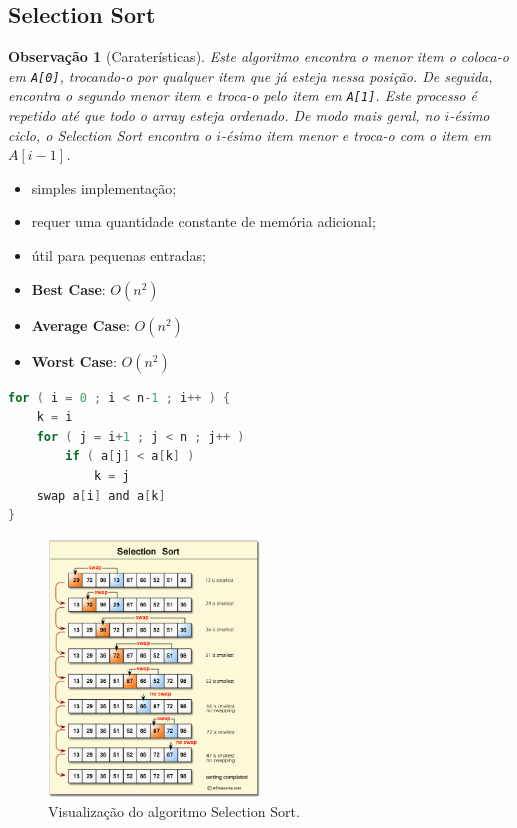 \documentclass[a4paper, 12pt]{article}
\newtheorem{remark}{Observação}
\begin{document}
\subsection{Selection Sort}
\begin{remark}[Caraterísticas]
    Este algoritmo encontra o menor item o coloca-o em \texttt{A[0]}, trocando-o por qualquer item que já esteja nessa posição. De seguida, encontra o segundo menor item e troca-o pelo item em \texttt{A[1]}. Este processo é repetido até que todo o array esteja ordenado.
    De modo mais geral, no $i$-ésimo ciclo, o Selection Sort encontra o $i$-ésimo item menor e troca-o com o item em $A[i-1]$.\end{remark}
    \begin{itemize}
        \item simples implementação;
        \item requer uma quantidade constante de memória adicional;
        \item útil para pequenas entradas;
        \item \textbf{Best Case}: $O(n^2)$
        \item \textbf{Average Case}: $O(n^2)$
        \item \textbf{Worst Case}: $O(n^2)$
    \end{itemize}


\begin{center}
    \begin{lstlisting}[frame=single, language=c, caption=Algoritmo Selection Sort, captionpos=b]
for ( i = 0 ; i < n-1 ; i++ ) {
    k = i
    for ( j = i+1 ; j < n ; j++ )
        if ( a[j] < a[k] )
            k = j
    swap a[i] and a[k]
}          
    \end{lstlisting}
    
    \begin{figure}[H]
        \centering
        \includegraphics[width=0.5\textwidth]{fig/ao/ss.png}
        \caption{Visualização do algoritmo Selection Sort.}
    \end{figure}
\end{center}
\end{document}
